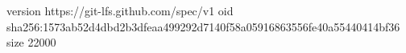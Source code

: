 version https://git-lfs.github.com/spec/v1
oid sha256:1573ab52d4dbd2b3dfeaa499292d7140f58a05916863556fe40a55440414bf36
size 22000
